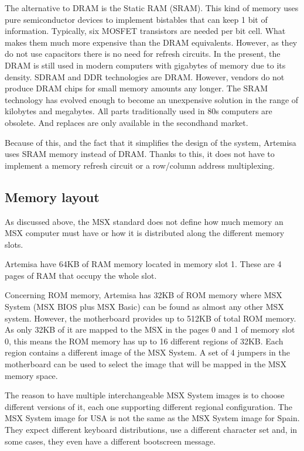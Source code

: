 The alternative to DRAM is the Static RAM (SRAM). This kind of memory uses pure semiconductor devices to implement bistables that can keep 1 bit of information. Typically, six MOSFET transistors are needed per bit cell. What makes them much more expensive than the DRAM equivalents. However, as they do not use capacitors there is no need for refresh circuits.
In the present, the DRAM is still used in modern computers with gigabytes of memory due to its density. SDRAM and DDR technologies are DRAM. However, vendors do not produce DRAM chips for small memory amounts any longer. The SRAM technology has evolved enough to become an unexpensive solution in the range of kilobytes and megabytes. All parts traditionally used in 80s computers are obsolete. And replaces are only available in the secondhand market.

Because of this, and the fact that it simplifies the design of the system, Artemisa uses SRAM memory instead of DRAM. Thanks to this, it does not have to implement a memory refresh circuit or a row/column address multiplexing.

\subsection{Memory layout}

As discussed above, the MSX standard does not define how much memory an MSX computer must have or how it is distributed along the different memory slots.

Artemisa have 64KB of RAM memory located in memory slot 1. These are 4 pages of RAM that occupy the whole slot.

Concerning ROM memory, Artemisa has 32KB of ROM memory where MSX System (MSX BIOS plus MSX Basic) can be found as almost any other MSX system. However, the motherboard provides up to 512KB of total ROM memory. As only 32KB of it are mapped to the MSX in the pages 0 and 1 of memory slot 0, this means the ROM memory has up to 16 different regions of 32KB. Each region contains a different image of the MSX System. A set of 4 jumpers in the motherboard can be used to select the image that will be mapped in the MSX memory space.

The reason to have multiple interchangeable MSX System images is to choose different versions of it, each one supporting different regional configuration. The MSX System image for USA is not the same as the MSX System image for Spain. They expect different keyboard distributions, use a different character set and, in some cases, they even have a different bootscreen message.

